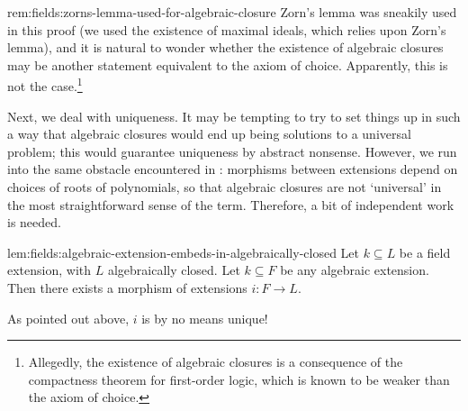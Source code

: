 \begin{rem}{}{rem:fields:zorns-lemma-used-for-algebraic-closure}
  Zorn's lemma was sneakily used in this proof (we used the existence
  of maximal ideals, which relies upon Zorn's lemma), and it is
  natural to wonder whether the existence of algebraic closures may be
  another statement equivalent to the axiom of choice. Apparently,
  this is not the case.\footnote{Allegedly, the existence of algebraic
    closures is a consequence of the compactness theorem for
    first-order logic, which is known to be weaker than the axiom of
    choice.}
\end{rem}
Next, we deal with uniqueness. It may be tempting to try to set things
up in such a way that algebraic closures would end up being solutions
to a universal problem; this would guarantee uniqueness by abstract
nonsense.  However, we run into the same obstacle encountered in
: morphisms between extensions depend on choices
of roots of polynomials, so that algebraic closures are not
`universal' in the most straightforward sense of the term. Therefore,
a bit of independent work is needed.
\begin{lem}{}{lem:fields:algebraic-extension-embeds-in-algebraically-closed}
  Let $k \subseteq L$ be a field extension, with $L$ algebraically
  closed.  Let $k \subseteq F$ be any algebraic extension. Then there
  exists a morphism of extensions $i : F \to L$.
\end{lem}
As pointed out above, $i$ is by no means unique!
